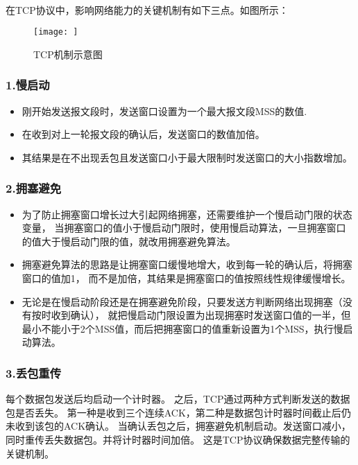 \documentclass[UTF8]{ctexart}
\begin{document}
\paragraph{}
在TCP协议中，影响网络能力的关键机制有如下三点。如图所示：
\begin{figure}
    \centering
    \texttt{[image: ]}
    \caption{TCP机制示意图}
\end{figure}

\subsubsection{1.慢启动}
\begin{itemize}
    \item 刚开始发送报文段时，发送窗口设置为一个最大报文段MSS的数值.
    \item 在收到对上一轮报文段的确认后，发送窗口的数值加倍。
    \item 其结果是在不出现丢包且发送窗口小于最大限制时发送窗口的大小指数增加。
\end{itemize}
\subsubsection{2.拥塞避免}
\begin{itemize}
    \item 为了防止拥塞窗口增长过大引起网络拥塞，还需要维护一个慢启动门限的状态变量，
    当拥塞窗口的值小于慢启动门限时，使用慢启动算法，一旦拥塞窗口的值大于慢启动门限的值，就改用拥塞避免算法。

    \item 拥塞避免算法的思路是让拥塞窗口缓慢地增大，收到每一轮的确认后，将拥塞窗口的值加1，
    而不是加倍，其结果是拥塞窗口的值按照线性规律缓慢增长。

    \item 无论是在慢启动阶段还是在拥塞避免阶段，只要发送方判断网络出现拥塞（没有按时收到确认），
    就把慢启动门限设置为出现拥塞时发送窗口值的一半，但最小不能小于2个MSS值，而后把拥塞窗口的值重新设置为1个MSS，执行慢启动算法。
\end{itemize}
\subsubsection{3.丢包重传}
    每个数据包发送后均启动一个计时器。
    之后，TCP通过两种方式判断发送的数据包是否丢失。
    第一种是收到三个连续ACK，第二种是数据包计时器时间截止后仍未收到该包的ACK确认。
    当确认丢包之后，拥塞避免机制启动。发送窗口减小，同时重传丢失数据包。并将计时器时间加倍。
    这是TCP协议确保数据完整传输的关键机制。
\end{document}
